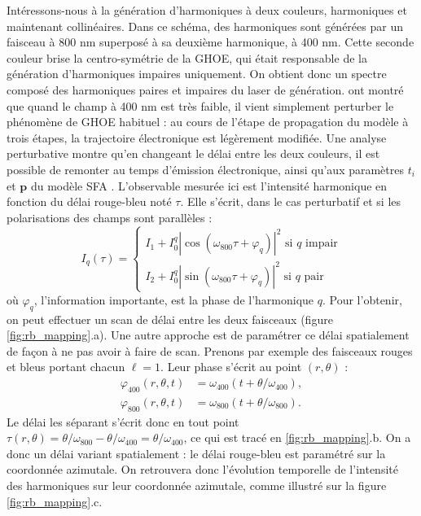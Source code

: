 Intéressons-nous à la génération d'harmoniques à deux couleurs, harmoniques et maintenant collinéaires. Dans ce schéma, des harmoniques sont générées par un faisceau à 800 nm superposé à sa deuxième harmonique, à 400 nm. Cette seconde couleur brise la centro-symétrie de la GHOE, qui était responsable de la génération d'harmoniques impaires uniquement. On obtient donc un spectre composé des harmoniques paires et impaires du laser de génération.  ont montré que quand le champ à 400 nm est très faible, il vient simplement perturber le phénomène de GHOE habituel : au cours de l'étape de propagation du modèle à trois étapes, la trajectoire électronique est légèrement modifiée. Une analyse perturbative montre qu'en changeant le délai entre les deux couleurs, il est possible de remonter au temps d'émission électronique, ainsi qu'aux paramètres $t_i$ et $\bm{p}$ du modèle SFA . L'observable mesurée ici est l'intensité harmonique en fonction du délai rouge-bleu noté $\tau$. Elle s'écrit, dans le cas perturbatif et si les polarisations des champs sont parallèles :
\begin{equation}
I_q(\tau)=
\begin{cases}
I_1 + I^q_0\left|\cos(\omega_{800}\tau+\varphi_q)\right|^2\text{ si $q$ impair}\\
I_2 + I^q_0\left|\sin(\omega_{800}\tau+\varphi_q)\right|^2\text{ si $q$ pair}
\end{cases}
\label{eq:oren}
\end{equation}
où $\varphi_q$, l'information importante, est la phase de l'harmonique $q$. Pour l'obtenir, on peut effectuer un scan de délai entre les deux faisceaux (figure \ref{fig:rb_mapping}.a). Une autre approche est de paramétrer ce délai spatialement de façon à ne pas avoir à faire de scan. Prenons par exemple des faisceaux rouges et bleus portant chacun $\ell=1$. Leur phase s'écrit au point $(r,\theta)$ :
\begin{align}
\varphi_{400}(r,\theta,t) &= \omega_{400}(t + \theta/\omega_{400}),\\
\varphi_{800}(r,\theta,t) &= \omega_{800}(t + \theta/\omega_{800}).
\end{align}
Le délai les séparant s'écrit donc en tout point $\tau(r,\theta) = \theta/\omega_{800}-\theta/\omega_{400} = \theta/\omega_{400}$, ce qui est tracé en \ref{fig:rb_mapping}.b. On a donc un délai variant spatialement : le délai rouge-bleu est paramétré sur la coordonnée azimutale. On retrouvera donc l'évolution temporelle de l'intensité des harmoniques sur leur coordonnée azimutale, comme illustré sur la figure \ref{fig:rb_mapping}.c.
